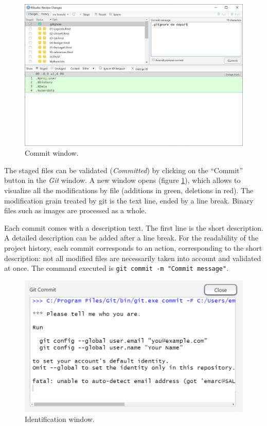 \documentclass[
  12pt,
  american,
  a4paper,
  extrafontsizes,onecolumn,openright
  ]{memoir}
\begin{document}
\scriptsize

\begin{figure}

{\centering \includegraphics[width=0.8\linewidth]{images/git-Commit} 

}

\caption{Commit window.}\label{fig:git-Commit}
\end{figure}

\normalsize

The staged files can be validated (\emph{Committed}) by clicking on the \enquote{Commit} button in the \emph{Git} window.
A new window opens (figure \ref{fig:git-Commit}), which allows to visualize all the modifications by file (additions in green, deletions in red).
The modification grain treated by git is the text line, ended by a line break.
Binary files such as images are processed as a whole.

Each commit comes with a description text.
The first line is the short description.
A detailed description can be added after a line break.
For the readability of the project history, each commit corresponds to an action, corresponding to the short description: not all modified files are necessarily taken into account and validated at once.
The command executed is \texttt{git\ commit\ -m\ "Commit\ message"}.



\scriptsize

\begin{figure}

{\centering \includegraphics[width=0.8\linewidth]{images/git-id} 

}

\caption{Identification window.}\label{fig:git-id}
\end{figure}
\end{document}
